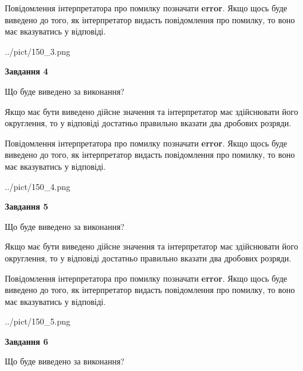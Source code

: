 \documentclass[12pt, ukrainian]{article}
\begin{document}
{\begin {Large}
Повідомлення інтерпретатора про помилку позначати \textbf{error}.
Якщо щось буде виведено до того, як інтерпретатор видасть повідомлення про помилку, 
то воно має вказуватись у відповіді. \par

\begin{center}
	{../pict/150_3.png}
\end{center}
\newpage

{\begin {center}\textbf{Завдання 4}\end {center}}\par
Що буде виведено за виконання? \par

Якщо має бути виведено дійсне значення та інтерпретатор має здійснювати його округлення, 
то у відповіді достатньо правильно вказати два дробових розряди.

Повідомлення інтерпретатора про помилку позначати \textbf{error}.
Якщо щось буде виведено до того, як інтерпретатор видасть повідомлення про помилку, 
то воно має вказуватись у відповіді. \par

\begin{center}
	{../pict/150_4.png}
\end{center}
\newpage

{\begin {center}\textbf{Завдання 5}\end {center}}\par
Що буде виведено за виконання? \par

Якщо має бути виведено дійсне значення та інтерпретатор має здійснювати його округлення, 
то у відповіді достатньо правильно вказати два дробових розряди.

Повідомлення інтерпретатора про помилку позначати \textbf{error}.
Якщо щось буде виведено до того, як інтерпретатор видасть повідомлення про помилку, 
то воно має вказуватись у відповіді. \par

\begin{center}
	{../pict/150_5.png}
\end{center}
\newpage

{\begin {center}\textbf{Завдання 6}\end {center}}\par
Що буде виведено за виконання? \par


\end{Large}}
\end{document}
